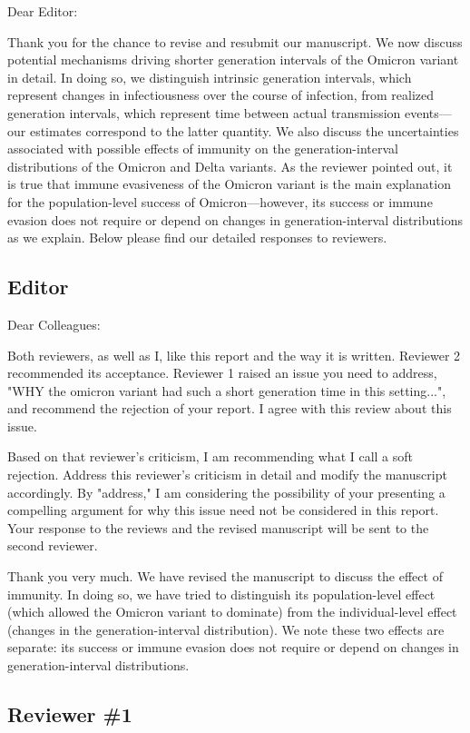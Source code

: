 \documentclass[12pt]{article}
\newcommand{\rev}{\subsection*}
\newcommand{\revtext}{\textsf}
\begin{document}
\noindent Dear Editor:

Thank you for the chance to revise and resubmit our manuscript. 
We now discuss potential mechanisms driving shorter generation intervals of the Omicron variant in detail.
In doing so, we distinguish intrinsic generation intervals, which represent changes in infectiousness over the course of infection, from realized generation intervals, which represent time between actual transmission events---our estimates correspond to the latter quantity.
We also discuss the uncertainties associated with possible effects of immunity on the generation-interval distributions of the Omicron and Delta variants.
As the reviewer pointed out, it is true that immune evasiveness of the Omicron variant is the main explanation for the population-level success of Omicron---however, its success or immune evasion does not require or depend on changes in generation-interval distributions as we explain. 
Below please find our detailed responses to reviewers.

\rev{Editor}

\revtext{Dear Colleagues:}

\revtext{Both reviewers, as well as I, like this report and the way it is written. Reviewer 2 recommended its acceptance. Reviewer 1 raised an issue you need to address, "WHY the omicron variant had such a short generation time in this setting...", and 
recommend the rejection of your report. I agree with this review about this issue.}

\revtext{Based on that reviewer's criticism, I am recommending what I call a soft rejection. Address this reviewer's criticism in detail and modify the manuscript accordingly. By "address," I am considering the possibility of your presenting a compelling argument for why this issue need not be considered in this report. Your response to the reviews and the revised manuscript will be sent to the second reviewer.}

Thank you very much. We have revised the manuscript to discuss the effect of immunity. In doing so, we have tried to distinguish its population-level effect (which allowed the Omicron variant to dominate) from the individual-level effect (changes in the generation-interval distribution).
We note these two effects are separate: its success or immune evasion does not require or depend on changes in generation-interval distributions.

\rev{Reviewer \#1}
\end{document}
